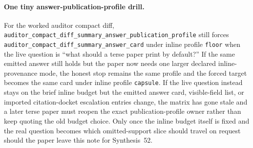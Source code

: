 \documentclass[11pt]{article}
\begin{document}
\paragraph{One tiny answer-publication-profile drill.}
For the worked auditor compact diff, \nolinkurl{auditor_compact_diff_summary_answer_publication_profile} still forces \nolinkurl{auditor_compact_diff_summary_answer_card} under inline profile \nolinkurl{floor} when the live question is ``what should a terse paper print by default?'' If the same emitted answer still holds but the paper now needs one larger declared inline-provenance mode, the honest stop remains the same profile and the forced target becomes the same card under inline profile \nolinkurl{capsule}. If the live question instead stays on the brief inline budget but the emitted answer card, visible-field list, or imported citation-docket escalation entries change, the matrix has gone stale and a later terse paper must reopen the exact publication-profile owner rather than keep quoting the old budget choice. Only once the inline budget itself is fixed and the real question becomes which omitted-support slice should travel on request should the paper leave this note for Synthesis~52.\cite{series:workedexample}
\end{document}
